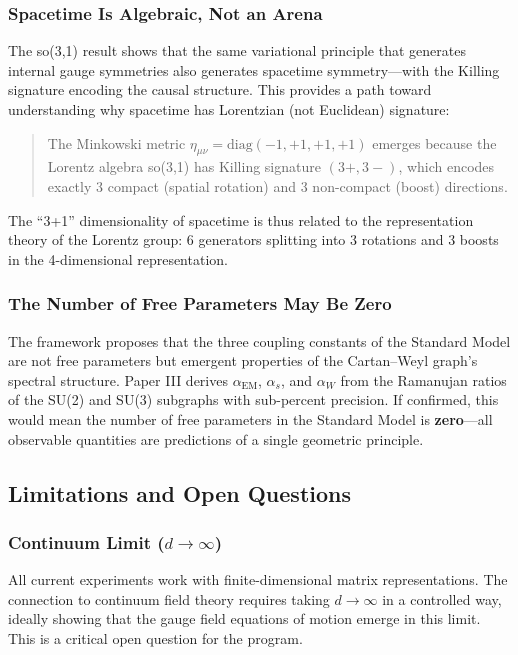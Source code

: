 \subsubsection{Spacetime Is Algebraic, Not an Arena}

The so(3,1) result shows that the same variational principle that generates internal gauge symmetries also generates spacetime symmetry---with the Killing signature encoding the causal structure. This provides a path toward understanding why spacetime has Lorentzian (not Euclidean) signature:

\begin{quote}
The Minkowski metric $\eta_{\mu\nu} = \mathrm{diag}(-1,+1,+1,+1)$ emerges because the Lorentz algebra so(3,1) has Killing signature $(3+,3-)$, which encodes exactly 3 compact (spatial rotation) and 3 non-compact (boost) directions.
\end{quote}

The ``3+1'' dimensionality of spacetime is thus related to the representation theory of the Lorentz group: 6 generators splitting into 3 rotations and 3 boosts in the 4-dimensional representation.

\subsubsection{The Number of Free Parameters May Be Zero}

The framework proposes that the three coupling constants of the Standard Model are not free parameters but emergent properties of the Cartan--Weyl graph's spectral structure. Paper III derives $\alpha_{\mathrm{EM}}$, $\alpha_s$, and $\alpha_W$ from the Ramanujan ratios of the SU(2) and SU(3) subgraphs with sub-percent precision. If confirmed, this would mean the number of free parameters in the Standard Model is \textbf{zero}---all observable quantities are predictions of a single geometric principle.

\subsection{Limitations and Open Questions}\label{sec:limitations}

\subsubsection{Continuum Limit ($d \to \infty$)}\label{sec:continuum_limit}

All current experiments work with finite-dimensional matrix representations. The connection to continuum field theory requires taking $d \to \infty$ in a controlled way, ideally showing that the gauge field equations of motion emerge in this limit. This is a critical open question for the program.

